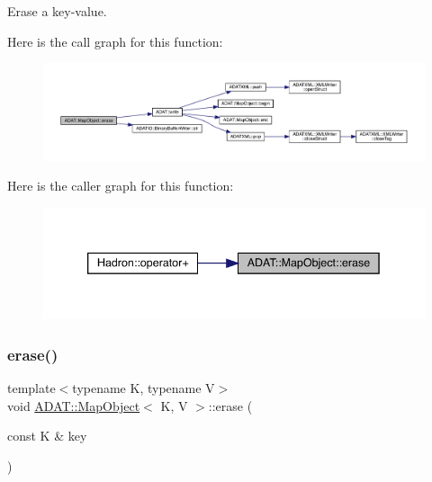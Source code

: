 Erase a key-\/value. 

Here is the call graph for this function\+:
\nopagebreak
\begin{figure}[H]
\begin{center}
\leavevmode
\includegraphics[width=350pt]{da/d29/classADAT_1_1MapObject_aa93bbf650a37c70e91904c9e7566eb6f_cgraph}
\end{center}
\end{figure}
Here is the caller graph for this function\+:
\nopagebreak
\begin{figure}[H]
\begin{center}
\leavevmode
\includegraphics[width=339pt]{da/d29/classADAT_1_1MapObject_aa93bbf650a37c70e91904c9e7566eb6f_icgraph}
\end{center}
\end{figure}
\mbox{\label{classADAT_1_1MapObject_aa93bbf650a37c70e91904c9e7566eb6f}} 
\subsubsection{\texorpdfstring{erase()}{erase()}\hspace{0.1cm}{\footnotesize\ttfamily [3/3]}}
{\footnotesize\ttfamily template$<$typename K, typename V$>$ \\
void \mbox{\hyperlink{classADAT_1_1MapObject}{A\+D\+A\+T\+::\+Map\+Object}}$<$ K, V $>$\+::erase (\begin{DoxyParamCaption}\item[{const K \&}]{key }\end{DoxyParamCaption})\hspace{0.3cm}{\ttfamily [inline]}}



